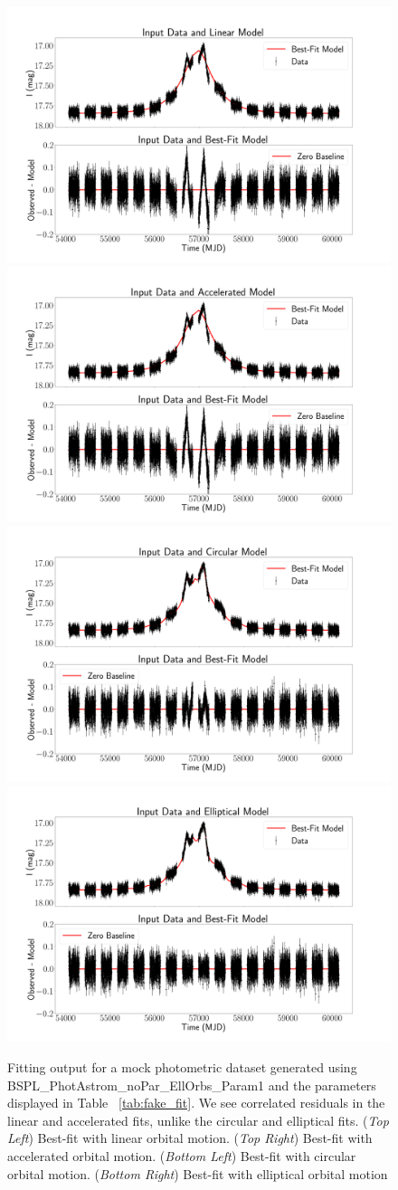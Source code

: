 \documentclass[twocolumn]{aastex701}
\begin{document}
\begin{figure}
    \centering
    \includegraphics[width= .48 \textwidth]{figures/LinAnal.png}
    \includegraphics[width= .48 \textwidth]{figures/AccAnal.png}
    \includegraphics[width= .48\textwidth]{figures/CircAnal.png}
    \includegraphics[width= .48\textwidth]{figures/EllAnal.png}

    \caption{Fitting output for a mock photometric dataset generated using  BSPL\_PhotAstrom\_noPar\_EllOrbs\_Param1 and the parameters displayed in Table ~\ref{tab:fake_fit}. We see correlated residuals in the linear and accelerated fits, unlike the circular and elliptical fits. 
    (\emph{Top Left}) Best-fit with linear orbital motion. (\emph{Top Right}) Best-fit with accelerated orbital motion. (\emph{Bottom Left}) Best-fit with circular orbital motion. (\emph{Bottom Right}) Best-fit with elliptical orbital motion}
    \label{fig:orbital_comparison}
\end{figure}
\end{document}

